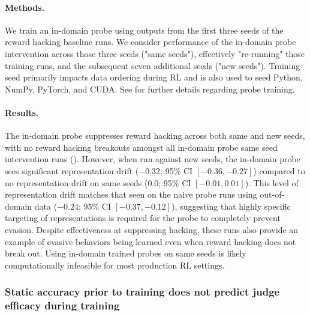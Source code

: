 \documentclass{article}
\begin{document}
\paragraph{Methods.}  We train an in-domain probe using outputs from the first three seeds of the reward hacking baseline runs. We consider performance of the in-domain probe intervention across those three seeds ("same seeds"), effectively "re-running" those training runs, and the subsequent seven additional seeds ("new seeds"). Training seed primarily impacts data ordering during RL and is also used to seed Python, NumPy, PyTorch, and CUDA. See  for further details regarding probe training.

\paragraph{Results.} The in-domain probe suppresses reward hacking across both same and new seeds, with no reward hacking breakouts amongst all in-domain probe same seed intervention runs (). However, when run against new seeds, the in-domain probe sees significant representation drift ($-0.32$; 95\% CI $[-0.36,-0.27]$) compared to no representation drift on same seeds ($0.0$; 95\% CI $[-0.01, 0.01]$). This level of representation drift matches that seen on the naive probe runs using out-of-domain data ($-0.24$; 95\% CI $[-0.37,-0.12]$), suggesting that highly specific targeting of representations is required for the probe to completely prevent evasion. Despite effectiveness at suppressing hacking, these runs also provide an example of evasive behaviors being learned even when reward hacking does not break out. Using in-domain trained probes on same seeds is likely computationally infeasible for most production RL settings.  

\subsubsection{Static accuracy prior to training does not predict judge efficacy during training}
\label{sec:judgereasoning}
\end{document}
